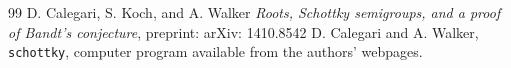 \documentclass{amsart}
\begin{document}
\begin{thebibliography}{99}
	D. Calegari, S. Koch, and A. Walker
	\emph{Roots, Schottky semigroups, and a proof of Bandt's conjecture},
	preprint: arXiv: 1410.8542
    D. Calegari and A. Walker,
    \texttt{schottky}, computer program available from the authors' webpages.
\end{thebibliography}
\end{document}
